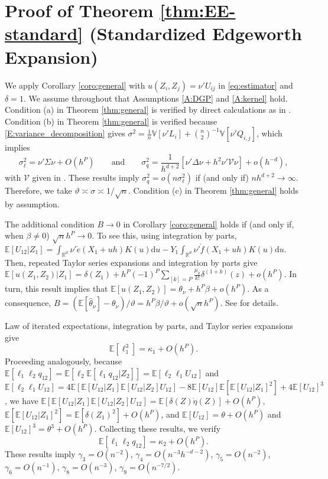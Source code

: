 \documentclass[11pt]{article}
\numberwithin{equation}{section}
\theoremstyle{definition}
\newcommand{\E}{\mathbb{E}}
\newcommand{\V}{\mathbb{V}}
\newcommand{\Scale}{\vartheta}
\begin{document}
\section{Proof of Theorem \ref{thm:EE-standard} (Standardized Edgeworth Expansion)}\label{App A: Proof for The Standardized Case}

We apply Corollary \ref{coro:general} with $u(Z_i,Z_j) = \nu'U_{ij}$ in \eqref{eq:estimator} and $\delta =1$. We assume throughout that Assumptions \ref{A:DGP} and \ref{A:kernel} hold. Condition (a) in Theorem \ref{thm:general} is verified by direct calculations as in \citet{Cattaneo-Crump-Jansson_2010_JASA,Cattaneo-Crump-Jansson_2014a_ET,Cattaneo-Crump-Jansson_2014b_ET}. Condition (b) in Theorem \ref{thm:general} is verified because \eqref{E:variance_decomposition} gives $\sigma^2 = \frac{1}{n} \V[\nu'L_i] + \binom{n}{2}^{-1} \V[\nu'Q_{i,j}]$, which implies
\[\sigma_\ell^2 = \nu'\Sigma\nu + O(h^P) \qquad\text{and}\qquad
  \sigma_q^2 = \frac{1}{h^{d+2}}[\nu'\Delta\nu + h^2 \nu'\mathcal{V}\nu] + o(h^{-d}),\]
with $\mathcal{V}$ given in \citet{Cattaneo-Crump-Jansson_2010_JASA}. These results imply $\sigma_q^2 = o(n\sigma_\ell^2)$ if (and only if) $nh^{d+2}\to\infty$. Therefore, we take $\Scale \asymp \sigma \asymp 1/\sqrt{n}$. Condition (c) in Theorem \ref{thm:general} holds by assumption.

The additional condition $B\to0$ in Corollary \ref{coro:general} holds if (and only if, when $\beta\neq 0$) $\sqrt{n}h^P\to 0$. To see this, using integration by parts, $\E[U_{12}|Z_1] = \int_{\mathbb{R}^d} \nu'\dot{e}(X_1+uh) K(u)\text{d}u - Y_1 \int_{\mathbb{R}^d}\nu'\dot{f}(X_1+uh) K(u)\text{d} u$. Then, repeated Taylor series expansions and integration by parts give $\E[u(Z_1,Z_2)|Z_1] = \delta(Z_1) + h^P(-1)^P\sum_{[k]=P}\frac{\mu_k}{k!} \delta^{(1+k)}(z)+ o(h^P)$. In turn, this result implies that $\E[u(Z_1,Z_2)] = \theta_\nu + h^P \beta + o(h^P)$. As a consequence, $B = (\E[\widehat{\theta}_\nu] - \theta_\nu)/\Scale = h^P\beta/\Scale + o(\sqrt{n}h^P)$. See \citet{Cattaneo-Crump-Jansson_2010_JASA,Cattaneo-Crump-Jansson_2014a_ET,Cattaneo-Crump-Jansson_2014b_ET} for details.

Law of iterated expectations, integration by parts, and Taylor series expansions give
\[\E[\ell_1^3] = \kappa_{1} + O(h^P).\]
Proceeding analogously, because $\E[\ell_1\ell_2q_{12}] = \E[\ell_2\E[\ell_1q_{12}|Z_2]]=\E[\ell_2\ell_1U_{12}]$ and $\E[\ell_2\ell_1U_{12}] = 4\E[\E[U_{12}|Z_1]\E[U_{12}|Z_2]U_{12}] - 8 \E[U_{12}]\E[\E[U_{12}|Z_1]^2] + 4\E[U_{12}]^3$, we have $\E[\E[U_{12}|Z_1]\E[U_{12}|Z_2]U_{12}] = \E[\delta(Z)\dot{\eta}(Z)] + O(h^P)$, $\E[\E[U_{12}|Z_1]^2] = \E[\delta(Z_1)^2] + O(h^P)$, and $\E[U_{12}] = \theta + O(h^P)$ and $\E[U_{12}]^3 = \theta^3 + O(h^P)$. Collecting these results, we verify
\[\E[\ell_1\ell_2q_{12}]= \kappa_{2} + O(h^P).\]
These results imply $\gamma_3=O(n^{-2})$, $\gamma_4=O(n^{-3}h^{-d-2})$, $\gamma_5=O(n^{-2})$, $\gamma_6=O(n^{-1})$, $\gamma_8=O(n^{-3})$, $\gamma_9=O(n^{-7/2})$.
\end{document}
